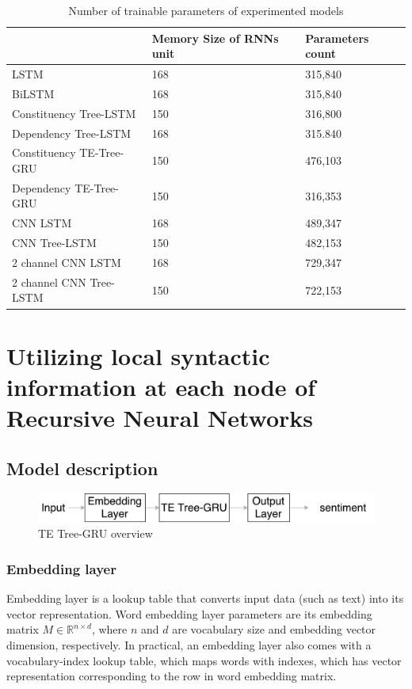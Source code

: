 \begin{table}[H]
    \centering
    \caption{Number of trainable parameters of experimented models}
    \label{table:paramtable}
    \begin{tabular}{lll}
        ~ & Memory Size of RNNs unit & Parameters count \\ \hline
        LSTM                     & 168         & 315,840          \\
        BiLSTM                   & 168         & 315,840          \\
        Constituency Tree-LSTM   & 150         & 316,800          \\
        Dependency Tree-LSTM     & 168         & 315.840          \\
        Constituency TE-Tree-GRU & 150         & 476,103          \\
        Dependency TE-Tree-GRU   & 150         & 316,353          \\
        CNN LSTM                 & 168         & 489,347          \\
        CNN Tree-LSTM            & 150         & 482,153          \\
        2 channel CNN LSTM       & 168         & 729,347          \\
        2 channel CNN Tree-LSTM  & 150         & 722,153
    \end{tabular}
\end{table}

\hypertarget{sec:VTtree}{\section{Utilizing local  syntactic information at each node of Recursive Neural Networks}}\label{sec:VTtree}
\subsection{Model description}

\begin{figure}[H]
    \centering
    \includegraphics[width=0.8\linewidth]{figure/vtgrusummary.pdf}
    \caption[TE Tree-GRU overview]{TE Tree-GRU overview}
    \label{fig:vtgrusummary}
\end{figure}

\subsubsection{Embedding layer}\label{sec:embedding}
Embedding layer is a lookup table that converts input data (such as text) into its vector representation. Word embedding layer parameters are its embedding matrix $M  \in \mathbb{R}^{n \times d}$, where $n$ and $d$ are vocabulary size and embedding vector dimension, respectively. In practical, an embedding layer also comes with a vocabulary-index lookup table, which maps words with indexes, which has vector representation corresponding to the row in word embedding matrix.

